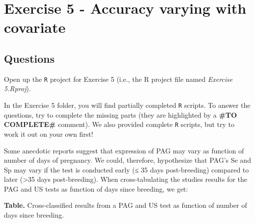 \documentclass[
]{book}
\begin{document}
\chapter{Exercise 5 - Accuracy varying with covariate}\label{exercise-5---accuracy-varying-with-covariate}

\section{Questions}\label{questions-4}

Open up the \texttt{R} project for Exercise 5 (i.e., the R project file named \emph{Exercise 5.Rproj}).

In the Exercise 5 folder, you will find partially completed \texttt{R} scripts. To answer the questions, try to complete the missing parts (they are highlighted by a \textbf{\#TO COMPLETE\#} comment). We also provided complete \texttt{R} scripts, but try to work it out on your own first!

Some anecdotic reports suggest that expression of PAG may vary as function of number of days of pregnancy. We could, therefore, hypothesize that PAG's Se and Sp may vary if the test is conducted early (≤ 35 days post-breeding) compared to later (\textgreater35 days post-breeding). When cross-tabulating the studies results for the PAG and US tests as function of days since breeding, we get:

\textbf{Table.} Cross-classified results from a PAG and US test as function of number of days since breeding.
\end{document}
